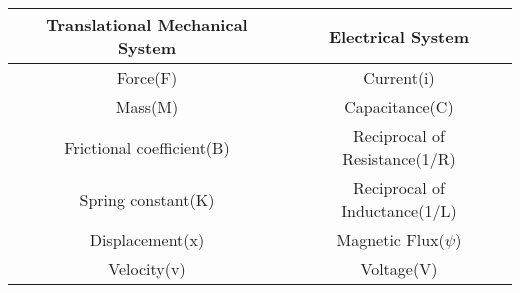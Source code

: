 \begin{tabular}{|c|c|} 
    \hline
\textbf{Translational Mechanical System} & \textbf{Electrical System}  \\\hline
    Force(F) &Current(i) \\\hline
    Mass(M) & Capacitance(C) \\\hline
    Frictional coefficient(B) &Reciprocal of Resistance(1/R) \\ \hline
    Spring constant(K) & Reciprocal of Inductance(1/L)  \\\hline
    Displacement(x) & Magnetic Flux($\psi $)\\ \hline
    Velocity(v) &  Voltage(V) \\\hline
        \end{tabular}
    
